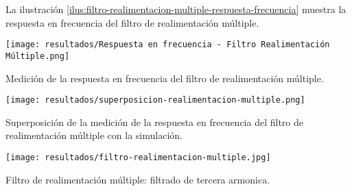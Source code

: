 La ilustración \ref{ilus:filtro-realimentacion-multiple-respuesta-frecuencia} muestra la respuesta en frecuencia del filtro de realimentación múltiple.


\begin{ilustracion}[h!]
    \centering
    \texttt{[image: resultados/Respuesta en frecuencia - Filtro Realimentación Múltiple.png]}
    \caption{Medición de la respuesta en frecuencia del filtro de realimentación múltiple.}
    \label{ilus:filtro-realimentacion-multiple-respuesta-frecuencia}
\end{ilustracion}

\begin{ilustracion}[h!]
    \centering
    \texttt{[image: resultados/superposicion-realimentacion-multiple.png]}
    \caption{Superposición de la medición de la respuesta en frecuencia del filtro de realimentación múltiple con la simulación.}
    \label{ilus:filtro-realimentacion-multiple-superposicion}
\end{ilustracion}


\begin{ilustracion}[ht]
    \centering
    \texttt{[image: resultados/filtro-realimentacion-multiple.jpg]}
    \caption{Filtro de realimentación múltiple: filtrado de tercera armonica.}
    \label{ilus:filtro-realimentacion-multiple-tercera-armonica}
\end{ilustracion}